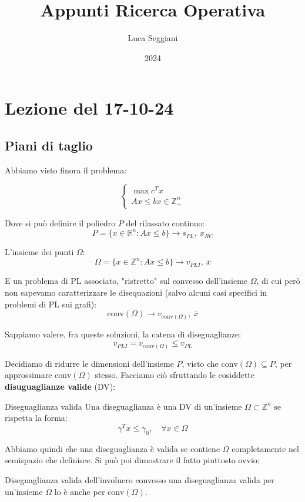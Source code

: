 \documentclass[a4paper,11pt]{article}
\title{Appunti Ricerca Operativa}
\author{Luca Seggiani}
\date{2024}
\begin{document}
\section{Lezione del 17-10-24}

\thispagestyle{empty}
\pagestyle{fancy}


\subsection{Piani di taglio}

Abbiamo visto finora il problema:

\[
	\begin{cases}
		\max c^T x \\
		Ax \leq b
		x \in \mathbb{Z}^n_+
	\end{cases}
\]

Dove si può definire il poliedro $P$ del rilassato continuo:
$$
P = \{ x \in \mathbb{R}^n : Ax \leq b \} \rightarrow s_{PL}, \ x_{RC}
$$

L'insieme dei punti $\Omega$:
$$
\Omega = \{ x \in \mathbb{Z}^n : Ax \leq b \} \rightarrow v_{PLI}, \ \bar{x}
$$

E un problema di PL associato, "ristretto" sul convesso dell'insieme $\Omega$, di cui però non sapevamo caratterizzare le disequazioni (salvo alcuni casi specifici in problemi di PL sui grafi): 
$$
\mathrm{conv}(\Omega) \rightarrow v_{\mathrm{conv}(\Omega)}, \ \bar{x} 
$$

Sappiamo valere, fra queste soluzioni, la catena di diseguaglianze:
$$ v_{PLI} = v_{\mathrm{conv}(\Omega)} \leq v_{PL} $$

Decidiamo di ridurre le dimensioni dell'insieme $P$, visto che $\mathrm{conv}(\Omega) \subseteq P$, per approssimare $\mathrm{conv}(\Omega)$ stesso.
Facciamo ciò sfruttando le cosiddette \textbf{disuguaglianze valide} (DV):
\begin{definition}{Diseguaglianza valida}
	Una diseguaglianza è una DV di un'insieme $\Omega \subset \mathbb{Z}^n$ se rispetta la forma:
	$$ \gamma^T x \leq \gamma_0, \quad \forall x \in \Omega $$
\end{definition}

Abbiamo quindi che una diseguaglianza è valida se contiene $\Omega$ completamente nel semispazio che definisce.
Si può poi dimostrare il fatto piuttosto ovvio:

\begin{theorem}{Diseguaglianza valida dell'involucro convesso}	
una diseguaglianza valida per un'insieme $\Omega$ lo è anche per $\mathrm{conv}(\Omega)$.
\end{theorem}
\end{document}
